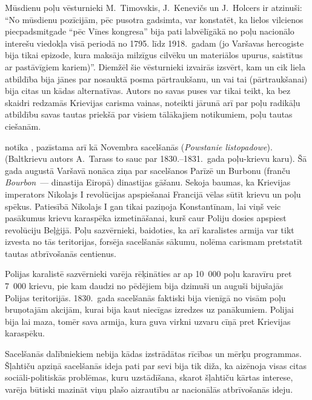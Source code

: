 \documentclass[twoside,a5paper,12pt,fleqn,openany]{extbook}
\newcommand{\pltxti}[1]{\textit{\textpolish{#1}}}
\newcommand{\frtxti}[1]{\textit{\textfrench{#1}}}
\begin{document}
Mūsdienu poļu vēsturnieki M.~Timovskis, J.~Kenevičs un J.~Holcers ir atzinuši: ``No mūsdienu pozīcijām, pēc pusotra gadsimta, var konstatēt, ka lielos vilcienos piecpadsmitgade ``pēc Vīnes kongresa'' bija pati labvēlīgākā no poļu nacionālo interešu viedokļa visā periodā no 1795. līdz 1918.~gadam (jo Varšavas hercogiste bija tikai epizode, kura maksāja milzīgus cilvēku un materiālos upurus, saistītus ar pastāvīgiem kariem)''. Diemžēl šie vēsturnieki izvairās izsvērt, kam un cik liela atbildība bija jānes par nosauktā posma pārtraukšanu, un vai tai (pārtraukšanai) bija citas un kādas alternatīvas. Autors no savas puses var tikai teikt, ka bez skaidri redzamās Krievijas carisma vainas, noteikti jārunā arī par poļu radikāļu atbildību savas tautas priekšā par visiem tālākajiem notikumiem, poļu tautas ciešanām.

 notika , pazīstama arī kā Novembra sacelšanās (\pltxti{Powstanie listopadowe}). (Baltkrievu autors A.~Tarass to sauc par 1830.--1831.~gada poļu-krievu karu). Šā gada augustā Varšavā nonāca ziņa par sacelšanos Parīzē un Burbonu (franču \frtxti{Bourbon}~--- dinastija Eiropā) dinastijas gāšanu. Sekoja baumas, ka Krievijas imperators Nikolajs I revolūcijas apspiešanai Francijā vēlas sūtīt krievu un poļu spēkus. Patiesībā Nikolajs I gan tikai paziņoja Konstantīnam, lai viņš veic pasākumus krievu karaspēka izmetināšanai, kurš caur Poliju dosies apspiest revolūciju Beļģijā. Poļu sazvērnieki, baidoties, ka arī karalistes armija var tikt izvesta no tās teritorijas, forsēja sacelšanās sākumu, nolēma carismam pretstatīt tautas atbrīvošanās centienus.

Polijas karalistē sazvērnieki varēja rēķināties ar ap 10~000 poļu karavīru pret 7~000 krievu, pie kam daudzi no pēdējiem bija dzimuši un auguši bijušajās Polijas teritorijās. 1830.~gada sacelšanās faktiski bija vienīgā no visām poļu bruņotajām akcijām, kurai bija kaut niecīgas izredzes uz panākumiem. Polijai bija lai maza, tomēr sava armija, kura guva virkni uzvaru cīņā pret Krievijas karaspēku.

Sacelšanās dalībniekiem nebija kādas izstrādātas rīcības un mērķu programmas. Šļahtiču apziņā sacelšanās ideja pati par sevi bija tik diža, ka aizēnoja visas citas sociāli-politiskās problēmas, kuru uzstādīšana, skarot šļahtiču kārtas interese, varēja būtiski mazināt viņu plašo aizrautību ar nacionālās atbrīvošanās ideju.
\end{document}
